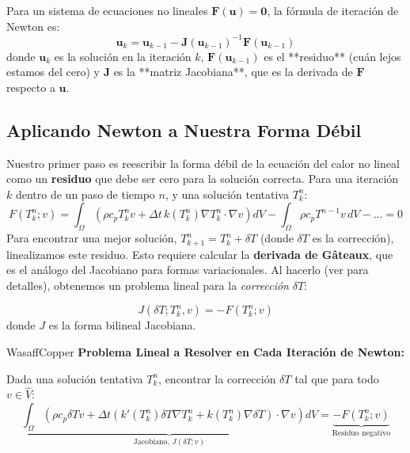 \documentclass[11pt, a4paper]{article}
\begin{document}
Para un sistema de ecuaciones no lineales $\mathbf{F}(\mathbf{u}) = \mathbf{0}$, la fórmula de iteración de Newton es:
\begin{equation}
    \mathbf{u}_k = \mathbf{u}_{k-1} - \mathbf{J}(\mathbf{u}_{k-1})^{-1} \mathbf{F}(\mathbf{u}_{k-1})
\end{equation}
donde $\mathbf{u}_k$ es la solución en la iteración $k$, $\mathbf{F}(\mathbf{u}_{k-1})$ es el **residuo** (cuán lejos estamos del cero) y $\mathbf{J}$ es la **matriz Jacobiana**, que es la derivada de $\mathbf{F}$ respecto a $\mathbf{u}$.

\subsection{Aplicando Newton a Nuestra Forma Débil}
Nuestro primer paso es reescribir la forma débil de la ecuación del calor no lineal como un \textbf{residuo} que debe ser cero para la solución correcta. Para una iteración $k$ dentro de un paso de tiempo $n$, y una solución tentativa $T_k^n$:
\begin{equation}
    F(T_k^n; v) = \int_{\Omega} \left( \rho c_p T_k^n v + \Delta t \, k(T_k^n) \nabla T_k^n \cdot \nabla v \right) dV - \int_{\Omega} \rho c_p T^{n-1} v \, dV - \dots = 0
    \label{eq:residuo_weak}
\end{equation}
Para encontrar una mejor solución, $T_{k+1}^n = T_k^n + \delta T$ (donde $\delta T$ es la corrección), linealizamos este residuo. Esto requiere calcular la \textbf{derivada de Gâteaux}, que es el análogo del Jacobiano para formas variacionales. Al hacerlo (ver \cite{bazant2003} para detalles), obtenemos un problema lineal para la \textit{corrección} $\delta T$:

\begin{equation}
    J(\delta T; T_k^n, v) = -F(T_k^n; v)
\end{equation}
donde $J$ es la forma bilineal Jacobiana.

\begin{keybox}{WasaffCopper}
    \textbf{Problema Lineal a Resolver en Cada Iteración de Newton:}
    
    Dada una solución tentativa $T_k^n$, encontrar la corrección $\delta T$ tal que para todo $v \in \hat{V}$:
    \begin{equation}
        \boxed{
        \underbrace{\int_{\Omega} \left( \rho c_p \delta T v + \Delta t (k'(T_k^n) \delta T \nabla T_k^n + k(T_k^n) \nabla \delta T) \cdot \nabla v \right) dV}_{\text{Jacobiano, } J(\delta T; v)} = \underbrace{-F(T_k^n; v)}_{\text{Residuo negativo}}
        }
        \label{eq:newton_weak}
    \end{equation}
\end{keybox}
\end{document}
